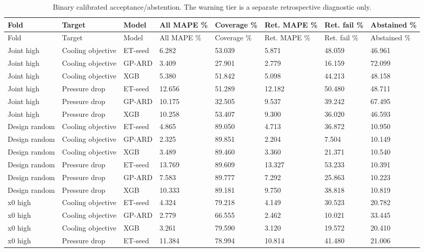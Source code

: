 \begingroup\small\setlength{\tabcolsep}{3pt}\begin{longtable}{llllllll}
\caption{Binary calibrated acceptance/abstention. The warning tier is a separate retrospective diagnostic only.}\label{tab:ubend-gate_decisions}\\\toprule
Fold & Target & Model & All MAPE \% & Coverage \% & Ret. MAPE \% & Ret. fail \% & Abstained \%\\\midrule
\endfirsthead\toprule
Fold & Target & Model & All MAPE \% & Coverage \% & Ret. MAPE \% & Ret. fail \% & Abstained \%\\\midrule
\endhead
Joint high & Cooling objective & ET-seed & 6.282 & 53.039 & 5.871 & 48.059 & 46.961\\
Joint high & Cooling objective & GP-ARD & 3.409 & 27.901 & 2.779 & 16.159 & 72.099\\
Joint high & Cooling objective & XGB & 5.380 & 51.842 & 5.098 & 44.213 & 48.158\\
Joint high & Pressure drop & ET-seed & 12.656 & 51.289 & 12.182 & 50.480 & 48.711\\
Joint high & Pressure drop & GP-ARD & 10.175 & 32.505 & 9.537 & 39.242 & 67.495\\
Joint high & Pressure drop & XGB & 10.258 & 53.407 & 9.300 & 36.020 & 46.593\\
Design random & Cooling objective & ET-seed & 4.865 & 89.050 & 4.713 & 36.872 & 10.950\\
Design random & Cooling objective & GP-ARD & 2.325 & 89.851 & 2.204 & 7.504 & 10.149\\
Design random & Cooling objective & XGB & 3.489 & 89.460 & 3.360 & 21.371 & 10.540\\
Design random & Pressure drop & ET-seed & 13.769 & 89.609 & 13.327 & 53.233 & 10.391\\
Design random & Pressure drop & GP-ARD & 7.583 & 89.777 & 7.292 & 25.863 & 10.223\\
Design random & Pressure drop & XGB & 10.333 & 89.181 & 9.750 & 38.818 & 10.819\\
x0 high & Cooling objective & ET-seed & 4.324 & 79.218 & 4.149 & 30.523 & 20.782\\
x0 high & Cooling objective & GP-ARD & 2.779 & 66.555 & 2.462 & 10.021 & 33.445\\
x0 high & Cooling objective & XGB & 3.261 & 79.590 & 3.120 & 19.572 & 20.410\\
x0 high & Pressure drop & ET-seed & 11.384 & 78.994 & 10.814 & 41.480 & 21.006\\

\end{longtable}
